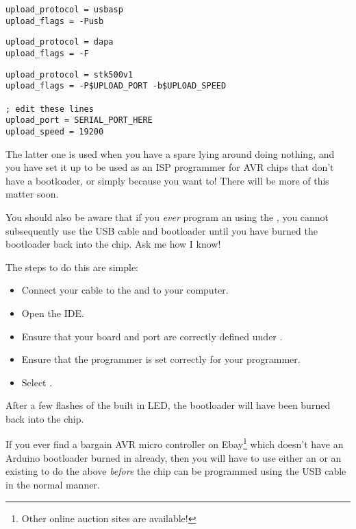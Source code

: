 \begin{lstlisting}[numbers={none},caption={The \inline{platformio.ini} additions for `USBasp' ISP Programmer}]
upload_protocol = usbasp
upload_flags = -Pusb
\end{lstlisting}


\begin{lstlisting}[numbers={none},caption={The \inline{platformio.ini} additions for `Parallel Port' ISP Programmer}]
upload_protocol = dapa
upload_flags = -F
\end{lstlisting}


\begin{lstlisting}[numbers={none},caption={The \inline{platformio.ini} additions for `Arduino as ISP` Programmer}]
upload_protocol = stk500v1
upload_flags = -P$UPLOAD_PORT -b$UPLOAD_SPEED

; edit these lines
upload_port = SERIAL_PORT_HERE
upload_speed = 19200
\end{lstlisting}

The latter one is used when you have a spare   lying around doing nothing, and you have set it up to be used as an ISP programmer for AVR chips that don't have a bootloader, or simply because you want to! There will be more of this matter soon.

\begin{warning}\label{reburn-the-bootloader}
You should also be aware that if you \emph{ever} program an   using the , you cannot subsequently use the USB cable and bootloader until you have burned the bootloader back into the chip. Ask me how I know! 

The steps to do this are simple:

\begin{itemize}
\item Connect your  cable to the  and to your computer.
\item Open the   IDE.
\item Ensure that your board and port are correctly defined under .
\item Ensure that the programmer is set correctly for your programmer.
\item Select .
\end{itemize}

After a few flashes of the built in LED, the bootloader will have been burned back into the chip. 

\begin{note}
	If you ever find a bargain AVR micro controller on Ebay\footnote{Other online auction sites are available!} which doesn't have an Arduino bootloader burned in already, then you will have to use either an  or an existing  to do the above \emph{before} the chip can be programmed using the USB cable in the normal  manner.
\end{note}
\end{warning}



